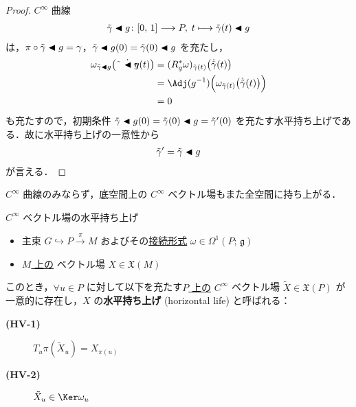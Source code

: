 \documentclass[TQFT_main]{subfiles}
\begin{document}
\begin{proof}
    $C^\infty$ 曲線
    \begin{align}
        \tilde{\gamma} \blacktriangleleft g \colon [0,\, 1] \longrightarrow P,\; t \longmapsto \tilde{\gamma}(t) \blacktriangleleft g
    \end{align}
    は，$\pi \circ \tilde{\gamma} \blacktriangleleft g = \gamma$，$\tilde{\gamma} \blacktriangleleft g(0) = \tilde{\gamma}(0) \blacktriangleleft g$ を充たし，
    \begin{align}
        \omega_{\tilde{\gamma} \btl g}\bigl(\dot{\tilde{\gamma} \btl g} (t)\bigr)
        &= (R_g^*\omega)_{\tilde{\gamma}(t)} \bigl( \dot{\tilde{\gamma}}(t) \bigr) \\
        &= \Adj(g^{-1}) \Bigl(\omega_{\tilde{\gamma}(t)} \bigl( \dot{\tilde{\gamma}}(t) \bigr)\Bigr) \\
        &= 0
    \end{align}
    も充たすので，初期条件 $\tilde{\gamma} \blacktriangleleft g(0) = \tilde{\gamma}(0) \blacktriangleleft g = \tilde{\gamma}'(0)$ を充たす水平持ち上げである．故に水平持ち上げの一意性から
    \begin{align}
        \tilde{\gamma}' = \tilde{\gamma} \blacktriangleleft g
    \end{align}
    が言える．
\end{proof}


$C^\infty$ 曲線のみならず，底空間上の $C^\infty$ ベクトル場もまた全空間に持ち上がる．

\begin{mydef}[label=def:horizontal-lift-vecf]{$C^\infty$ ベクトル場の水平持ち上げ}
    \begin{itemize}
        \item 主束 $G \hookrightarrow P \xrightarrow{\pi} M$ およびその\hyperref[def:connection]{接続形式} $\omega \in \Omega^1(P;\, \mathfrak{g})$
        \item \underline{$M$ 上の} \cinfty ベクトル場 $X \in \mathfrak{X}(M)$
    \end{itemize}
    このとき，$\forall u \in P$ に対して以下を充たす\underline{$P$ 上の} $C^\infty$ ベクトル場 $\tilde{X} \in \mathfrak{X}(P)$ が一意的に存在し，$X$ の\textbf{水平持ち上げ} (horizontal life) と呼ばれる：
    \begin{description}
        \item[\textbf{(HV-1)}] $T_u \pi (\tilde{X}_u) = X_{\pi(u)}$
        \item[\textbf{(HV-2)}] $\tilde{X}_u \in \Ker \omega_u$
    \end{description}
\end{mydef}
\end{document}
